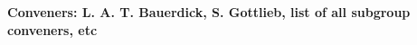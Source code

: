 

\begin{center}

\begin{large} {\bf Conveners: L. A. T. Bauerdick, S. Gottlieb, list of all subgroup conveners, etc} \end{large}

 

\end{center}

